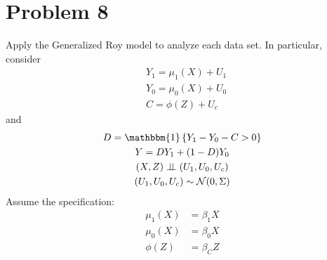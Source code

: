\documentclass{article}
\begin{document}
\section*{Problem 8}
Apply the Generalized Roy model to analyze each data set. In particular, consider
\begin{align*}
    &Y_{1}=\mu_{1}(X)+U_{1} \\
    &Y_{0}=\mu_{0}(X)+U_{0} \\
    &C=\phi(Z)+U_{c}
\end{align*}
and
\begin{gather*}
    D=\mathbbm{1}\left\{Y_{1}-Y_{0}-C>0\right\} \\
    Y=D Y_{1}+(1-D) Y_{0} \\
    (X, Z) \indp \left(U_{1}, U_{0}, U_{c}\right) \\
    \left(U_{1}, U_{0}, U_{c}\right) \sim \mathcal{N}(0, \Sigma)
\end{gather*}
Assume the specification:
\begin{align*}
    \mu_{1}(X) &=\beta_{1} X \\
    \mu_{0}(X) &=\beta_{0} X \\
    \phi(Z) &=\beta_{C} Z
\end{align*}
 
\end{document}
